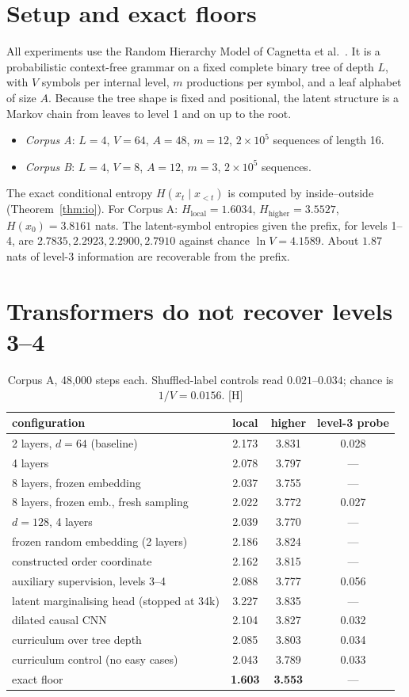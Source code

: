 \documentclass[11pt]{article}
\theoremstyle{definition}
\theoremstyle{remark}
\newcommand{\src}[1]{\textsf{\small[#1]}}
\begin{document}
\section{Setup and exact floors}

All experiments use the Random Hierarchy Model of Cagnetta et al.~\cite{cagnetta}. It is a probabilistic context-free grammar on a fixed complete binary tree of depth $L$, with $V$ symbols per internal level, $m$ productions per symbol, and a leaf alphabet of size $A$. Because the tree shape is fixed and positional, the latent structure is a Markov chain from leaves to level 1 and on up to the root.
\begin{itemize}
  \item \emph{Corpus A}: $L=4$, $V=64$, $A=48$, $m=12$, $2\times10^5$ sequences of length 16.
  \item \emph{Corpus B}: $L=4$, $V=8$, $A=12$, $m=3$, $2\times10^5$ sequences.
\end{itemize}
The exact conditional entropy $H(x_t\mid x_{<t})$ is computed by inside--outside (Theorem~\ref{thm:io}). For Corpus A: $H_{\text{local}}=1.6034$, $H_{\text{higher}}=3.5527$, $H(x_0)=3.8161$ nats. The latent-symbol entropies given the prefix, for levels 1--4, are $2.7835,2.2923,2.2900,2.7910$ against chance $\ln V=4.1589$. About $1.87$ nats of level-3 information are recoverable from the prefix.

\section{Transformers do not recover levels 3--4}
\begin{table}[!htbp]\centering\small
\begin{tabular}{lccc}
\toprule
configuration & local & higher & level-3 probe\\
\midrule
2 layers, $d=64$ (baseline) & 2.173 & 3.831 & 0.028\\
4 layers & 2.078 & 3.797 & ---\\
8 layers, frozen embedding & 2.037 & 3.755 & ---\\
8 layers, frozen emb., fresh sampling & 2.022 & 3.772 & 0.027\\
$d=128$, 4 layers & 2.039 & 3.770 & ---\\
frozen random embedding (2 layers) & 2.186 & 3.824 & ---\\
constructed order coordinate & 2.162 & 3.815 & ---\\
auxiliary supervision, levels 3--4 & 2.088 & 3.777 & 0.056\\
latent marginalising head (stopped at 34k) & 3.227 & 3.835 & ---\\
dilated causal CNN & 2.104 & 3.827 & 0.032\\
curriculum over tree depth & 2.085 & 3.803 & 0.034\\
curriculum control (no easy cases) & 2.043 & 3.789 & 0.033\\
\midrule
exact floor & \textbf{1.603} & \textbf{3.553} & ---\\
\bottomrule
\end{tabular}
\caption{Corpus A, 48{,}000 steps each. Shuffled-label controls read $0.021$--$0.034$; chance is $1/V=0.0156$. \src{H}}
\end{table}
\end{document}

